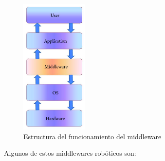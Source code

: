 \begin{figure}[H]
  \begin{center}
    \includegraphics[width=0.3\textwidth]{figures/Introduccion/middleware.jpg}
		\caption{Estructura del funcionamiento del middleware}
		\label{fig.middleware}
		\end{center}
\end{figure}

Algunos de estos middlewares robóticos son:

